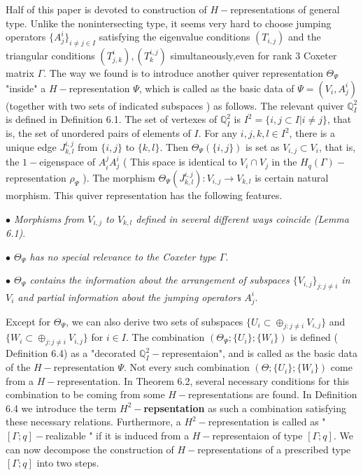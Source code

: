 \def\CTEXPreproc{Created by ctex v0.2.12, don't edit!}\documentclass[11pt]{article}
\begin{document}
   Half of this paper is devoted to construction of $H-$representations of general type. Unlike the nonintersecting type, it seems very hard to choose jumping operators $\{ A^i _j \}_{i\neq j\in I}$ satisfying the eigenvalue conditions $(T_{i,j})$ and the triangular conditions $(T^i _{j,k}),  (T^{i,j}_k )$ simultaneously,even for rank 3 Coxeter matrix $\Gamma$.  The way we found is to introduce another quiver representation $\Theta_{\Psi}$ "inside" a $H-$representation $\Psi$, which is called as the basic data of $\Psi= (V_i , A^i _j )$ (together with two sets of  indicated subspaces ) as follows. The relevant quiver $\mathbb{Q}^2 _I $ is defined in Definition 6.1. The set of vertexes of $\mathbb{Q}^2 _I$ is $I^2 =\{ {i,j}\subset I | i\neq j \}$, that is, the set of unordered pairs of elements of $I$. For any ${i,j}, {k,l} \in I^2$, there
   is a unique edge $J^{i,j} _{k,l}$ from $\{ i,j\}$ to $\{ k,l\}$.  Then $\Theta_{\Psi}( \{ i,j\}  )$ is set as $V_{i,j}\subset V_i $, that is, the $1-$eigenspace of $A^j _i A^i _j$ ( This space is identical to $V_i \cap V_j $ in the $H_q (\Gamma)-$representation $\rho_{\Psi}$  ). The morphism $\Theta_{\Psi}( J^{i,j}_{k,l}  ): V_{i,j} \rightarrow V_{k,l}$ is certain natural morphism. This quiver representation has the following features.

   \noindent \textit{$\bullet$ Morphisms from $V_{i,j}$ to $V_{k,l}$ defined in several different ways coincide (Lemma 6.1)}.

    \noindent \textit{$\bullet$ $\Theta_{\Psi}$ has no special relevance to the Coxeter type $\Gamma$}.

     \noindent \textit{$\bullet$ $\Theta_{\Psi}$ contains the information about the arrangement of subspaces $\{ V_{i,j} \}_{j:j\neq i}$ in $V_i$ and partial information about the jumping operators $A^i _j$}.

     Except for $\Theta_{\Psi}$, we can also derive two sets of subspaces $\{ U_i \subset \oplus _{j: j\neq i} V_{i,j} \} $ and $\{ W_i \subset \oplus _{j: j\neq i} V_{i,j} \} $ for $i\in I$. The combination $( \Theta_{\Psi} ; \{ U_i \} ; \{ W_i \}    )$ is defined ( Definition 6.4) as a "decorated $\mathbb{Q}^2 _{I}-$representaion", and is called as the basic data of the $H-$representation $\Psi$.
     Not every such combination $( \Theta ; \{ U_i \} ; \{ W_i \}    )$ come from a $H-$representation. In Theorem 6.2, several necessary conditions for this combination to be coming from some $H-$representations are found.  In Definition 6.4 we introduce the term \textbf{$H^2 -$repsentation} as such a combination satisfying these necessary relations. Furthermore,  a $H^2 -$representation is called as " $[\Gamma ;q]-$realizable " if it is induced from a $H-$representaion of type $[\Gamma ;q ]$.  We can now decompose the construction of $H-$representations of a prescribed type $[\Gamma ;q]$ into two steps.
\end{document}

